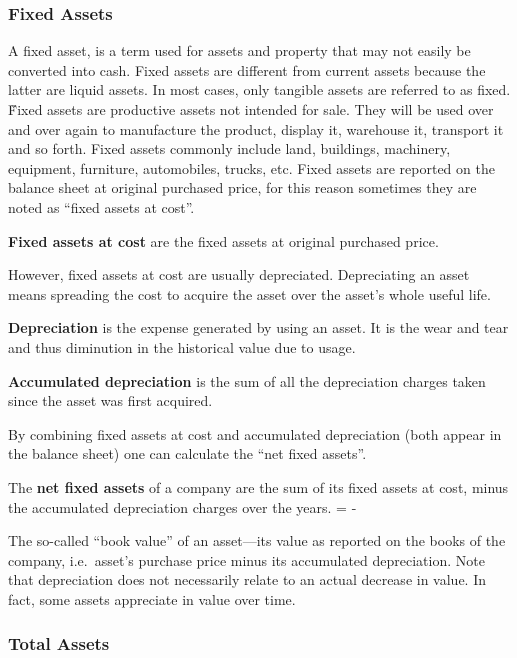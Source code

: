 \subsubsection{Fixed Assets}

A fixed asset, is a term used for assets and property that may not easily be converted into cash. Fixed assets are
different from current assets because the latter are liquid assets. In most cases, only tangible assets are referred to
as fixed. \v

Fixed assets are productive assets not intended for sale. They will be used over and over again to manufacture the
product, display it, warehouse it, transport it and so forth. Fixed assets commonly include land, buildings,
machinery, equipment, furniture, automobiles, trucks, etc. Fixed assets are reported on the balance sheet at original
purchased price, for this reason sometimes they are noted as ``fixed assets at cost''.

\textbf{Fixed assets at cost} are the fixed assets at original purchased price.
\ed

However, fixed assets at cost are usually depreciated. Depreciating an asset means spreading the cost to acquire the
asset over the asset's whole useful life.

\bd[Depreciation]
\textbf{Depreciation} is the expense generated by using an asset. It is the wear and tear and thus diminution in the
historical value due to usage.
\ed

\textbf{Accumulated depreciation} is the sum of all the depreciation charges taken since the asset was first acquired.
\ed

By combining fixed assets at cost and accumulated depreciation (both appear in the balance sheet) one can calculate
the ``net fixed assets''.

The \textbf{net fixed assets} of a company are the sum of its fixed assets at cost, minus the accumulated depreciation
charges over the years.
\bse
{} =  - 
\ese
\ed

The so-called ``book value'' of an asset—its value as reported on the books of the company, i.e.\ asset's purchase
price minus its accumulated depreciation. Note that depreciation does not necessarily relate to an actual decrease
in value. In fact, some assets appreciate in value over time.

\subsubsection{Total Assets}

